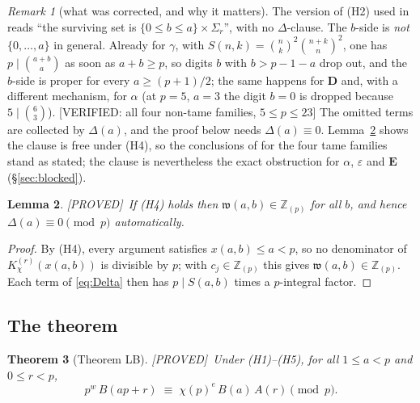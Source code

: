 \documentclass[11pt,reqno]{amsart}
\theoremstyle{plain}
\newtheorem{theorem}{Theorem}[section]
\newtheorem{lemma}[theorem]{Lemma}
\theoremstyle{definition}
\theoremstyle{remark}
\newtheorem{remark}[theorem]{Remark}
\newcommand{\Z}{\mathbb{Z}}
\newcommand{\Zp}{\Z_{(p)}}
\newcommand{\bin}[2]{\binom{#1}{#2}}
\newcommand{\KK}[3]{K^{(#1)}_{#2}\!\left(#3\right)}
\newcommand{\Proved}{\textup{\textsf{[PROVED]}}}
\newcommand{\VerifiedR}[1]{\textup{\textsf{[VERIFIED: #1]}}}
\numberwithin{equation}{section}
\begin{document}
\begin{remark}[what was corrected, and why it matters]\label{rem:H2}
The version of (H2) used in \cite{CompanionLucas2nd} reads ``the surviving set is
$\{0\le b\le a\}\times\Sigma_r$'', with no $\Delta$-clause. The $b$-side is \emph{not}
$\{0,\dots,a\}$ in general. Already for $\gamma$, with
$S(n,k)=\bin nk^2\bin{n+k}n^2$, one has $p\mid\bin{a+b}a$ as soon as $a+b\ge p$, so digits
$b$ with $b>p-1-a$ drop out, and the $b$-side is proper for every $a\ge(p+1)/2$; the same
happens for $\mathbf D$ and, with a different mechanism, for $\alpha$ (at $p=5$, $a=3$ the
digit $b=0$ is dropped because $5\mid\bin63$). \VerifiedR{all four non-tame families,
$5\le p\le23$} The omitted terms are collected by $\Delta(a)$, and the proof below needs
$\Delta(a)\equiv0$. Lemma~\ref{lem:Deltatame} shows the clause is free under (H4), so the
conclusions of \cite{CompanionLucas2nd} for the four tame families stand as stated; the
clause is nevertheless the exact obstruction for $\alpha$, $\varepsilon$ and $\mathbf E$
(\S\ref{sec:blocked}).
\end{remark}

\begin{lemma}\label{lem:Deltatame}
\Proved\ If (H4) holds then $\mathfrak w(a,b)\in\Zp$ for all $b$, and hence
$\Delta(a)\equiv0\pmod p$ automatically.
\end{lemma}

\begin{proof}
By (H4), every argument satisfies $x(a,b)\le a<p$, so no denominator of
$\KK{r}{\chi}{x(a,b)}$ is divisible by $p$; with $c_j\in\Zp$ this gives
$\mathfrak w(a,b)\in\Zp$. Each term of \eqref{eq:Delta} then has $p\mid S(a,b)$ times a
$p$-integral factor.
\end{proof}

\subsection{The theorem}
\begin{theorem}[Theorem LB]\label{thm:LB}
\Proved\ Under \textup{(H1)--(H5)}, for all $1\le a<p$ and $0\le r<p$,
\[
  p^{w}\,B(ap+r)\;\equiv\;\chi(p)^{e}\,B(a)\,A(r)\pmod p .
\]
\end{theorem}
\end{document}
